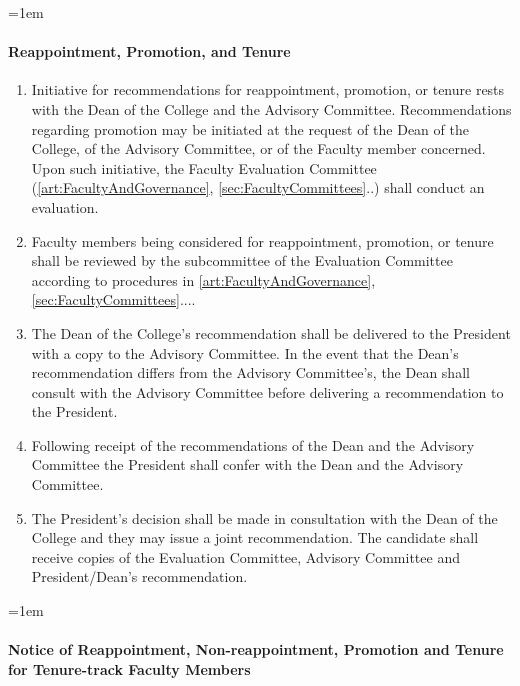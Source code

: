 \documentclass{manual}
\let\oldparagraph\paragraph
\renewcommand\paragraph{\leftskip=1em\oldparagraph}
\newcommand{\itemLevelA}{\alph*.}
\newcommand{\itemRefA}{\alph*}
\begin{document}
\paragraph{Reappointment, Promotion, and Tenure}
\begin{enumerate}[label=\itemLevelA,ref=\itemRefA]

\item Initiative for recommendations for reappointment, promotion, or tenure rests with the Dean of the College and the Advisory Committee. Recommendations regarding promotion may be initiated at the request of the Dean of the College, of the Advisory Committee, or of the Faculty member concerned. Upon such initiative, the Faculty Evaluation Committee (\cref{art:FacultyAndGovernance}, \cref{sec:FacultyCommittees}..) shall conduct an evaluation.

\item Faculty members being considered for reappointment, promotion, or tenure shall be reviewed by the subcommittee of the Evaluation Committee according to procedures in \cref{art:FacultyAndGovernance}, \cref{sec:FacultyCommittees}....

\item The Dean of the College's recommendation shall be delivered to the President with a copy to the Advisory Committee. In the event that the Dean's recommendation differs from the Advisory Committee's, the Dean shall consult with the Advisory Committee before delivering a recommendation to the President.

\item Following receipt of the recommendations of the Dean and the Advisory Committee the President shall confer with the Dean and the Advisory Committee.

\item The President's decision shall be made in consultation with the Dean of the College and they may issue a joint recommendation. The candidate shall receive copies of the Evaluation Committee, Advisory Committee and President/Dean's recommendation.
\end{enumerate}

\paragraph{Notice of Reappointment, Non-reappointment, Promotion and Tenure for Tenure-track Faculty Members}
\end{document}
